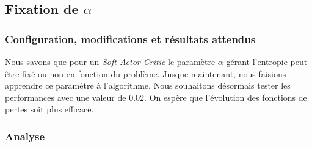 \subsection{Fixation de \texorpdfstring{\(\alpha\)}{a}}

\subsubsection{Configuration, modifications et résultats attendus}

Nous savons que pour un \emph{Soft Actor Critic} le paramètre \(\alpha\) gérant
l'entropie peut être fixé ou non en fonction du problème. Jusque maintenant,
nous faisions apprendre ce paramètre à l'algorithme. Nous souhaitons désormais tester les performances avec une valeur de \(0.02\). On espère que l'évolution des fonctions de pertes soit plus efficace.

\subsubsection{Analyse}

